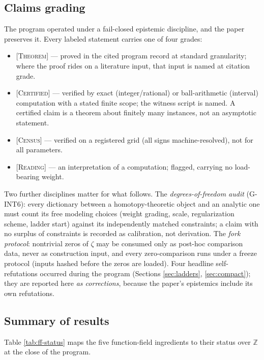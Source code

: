 \documentclass[11pt,reqno]{amsart}
\theoremstyle{plain}
\theoremstyle{definition}
\theoremstyle{remark}
\newcommand{\Z}{\mathbb{Z}}
\newcommand{\grade}[1]{\textup{[\textsc{#1}]}}
\begin{document}
\subsection{Claims grading}\label{subsec:grading}

The program operated under a fail-closed epistemic discipline, and the paper preserves it.
Every labeled statement carries one of four grades:
\begin{itemize}
\item \grade{Theorem} --- proved in the cited program record at standard granularity; where
the proof rides on a literature input, that input is named at citation grade.
\item \grade{Certified} --- verified by exact (integer/rational) or ball-arithmetic (interval)
computation with a stated finite scope; the witness script is named. A certified claim is a
theorem about finitely many instances, not an asymptotic statement.
\item \grade{Census} --- verified on a registered grid (all signs machine-resolved), not for
all parameters.
\item \grade{Reading} --- an interpretation of a computation; flagged, carrying no
load-bearing weight.
\end{itemize}
Two further disciplines matter for what follows. The \emph{degrees-of-freedom audit}
(G-INT6): every dictionary between a homotopy-theoretic object and an analytic one must count
its free modeling choices (weight grading, scale, regularization scheme, ladder start) against
its independently matched constraints; a claim with no surplus of constraints is recorded as
calibration, not derivation. The \emph{fork protocol}: nontrivial zeros of $\zeta$ may be
consumed only as post-hoc comparison data, never as construction input, and every
zero-comparison runs under a freeze protocol (inputs hashed before the zeros are loaded).
Four headline self-refutations occurred during the program (Sections \ref{sec:ladders},
\ref{sec:compact}); they are reported here \emph{as corrections}, because the paper's
epistemics include its own refutations.

\subsection{Summary of results}

Table \ref{tab:ff-status} maps the five function-field ingredients to their status over $\Z$
at the close of the program.
\end{document}
